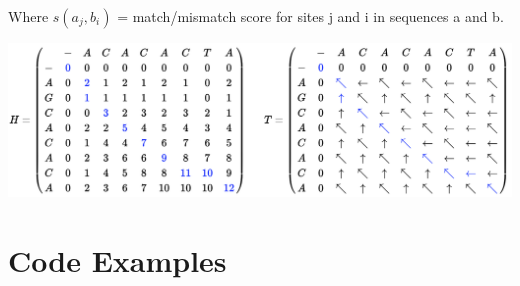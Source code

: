 \documentclass{article}
\begin{document}
Where $s(a_j , b_i)$ = match/mismatch score for sites j and i in sequences a and
b. \cite{columbia}

\vspace{2cm}
\begin{center}
    \includegraphics[scale=0.5]{sw.png}
\end{center}

\newpage
\section*{Code Examples}
\end{document}
